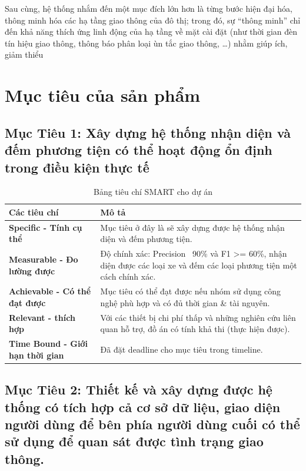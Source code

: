 \quad Sau cùng, hệ thống nhắm đến một mục đích lớn hơn là từng bước hiện đại hóa, thông minh hóa các hạ tầng giao thông của đô thị; trong đó, sự “thông minh” chỉ đến khả năng thích ứng linh động của hạ tầng về mặt cài đặt (như thời gian đèn tín hiệu giao thông, thông báo phân loại ùn tắc giao thông, …) nhằm giúp ích, giảm thiểu 

\section{Mục tiêu của sản phẩm}
\subsection*{Mục Tiêu 1: Xây dựng hệ thống nhận diện và đếm phương tiện có thể hoạt động ổn định trong điều kiện thực tế}

\begin{table}[h!]
    \centering
    \begin{tabular}{|p{7cm}|p{10cm}|}
    \hline
    \textbf{Các tiêu chí} & \textbf{Mô tả} \\
    \hline
    \textbf{Specific - Tính cụ thể} & Mục tiêu ở đây là sẽ xây dựng được hệ thống nhận diện và đếm phương tiện. \\
    \hline
    \textbf{Measurable - Đo lường được} & Độ chính xác: Precision ~90\% và F1 >= 60\%, nhận diện được các loại xe và đếm các loại phương tiện một cách chính xác. \\
    \hline
    \textbf{Achievable - Có thể đạt được} & Mục tiêu có thể đạt được nếu nhóm sử dụng công nghệ phù hợp và có đủ thời gian \& tài nguyên. \\
    \hline
    \textbf{Relevant - thích hợp} & Với các thiết bị chi phí thấp và những nghiên cứu liên quan hỗ trợ, đồ án có tính khả thi (thực hiện được). \\
    \hline
    \textbf{Time Bound - Giới hạn thời gian} & Đã đặt deadline cho mục tiêu trong timeline. \\
    \hline
    \end{tabular}
    \caption{Bảng tiêu chí SMART cho dự án}
\end{table}
\pagebreak
\subsection*{Mục Tiêu 2: Thiết kế và xây dựng được hệ thống có tích hợp cả cơ sở dữ liệu, giao diện người dùng để bên phía người dùng cuối có thể sử dụng để quan sát được tình trạng giao thông.}


